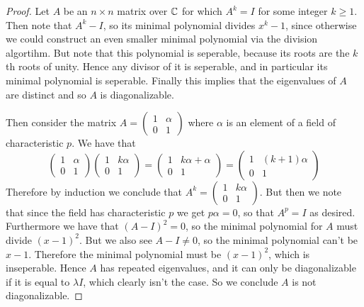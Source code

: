 \documentclass[11pt]{article}
\begin{document}
\begin{proof}
  Let $A$ be an $n \times n$ matrix over $\mathbb{C}$ for which $A^k = I$ for some integer $k \ge 1$. Then note that $A^k - I$, so its minimal polynomial divides $x^k - 1$, since otherwise we could construct an even smaller minimal polynomial via the division algortihm.
  But note that this polynomial is seperable, because its roots are the $k$th roots of unity.
  Hence any divisor of it is seperable, and in particular its minimal polynomial is seperable.
  Finally this implies that the eigenvalues of $A$ are distinct and so $A$ is diagonalizable.

  Then consider the matrix $A = \begin{pmatrix}1 & \alpha \\ 0 & 1\end{pmatrix}$ where $\alpha$ is an element of a field of characteristic $p$.
  We have that
  \begin{equation}
    \begin{pmatrix}
      1 & \alpha \\ 0 & 1
    \end{pmatrix}
    \begin{pmatrix}
      1 & k\alpha \\ 0 & 1
    \end{pmatrix} =
    \begin{pmatrix}
      1 & k\alpha + \alpha \\ 0 & 1
    \end{pmatrix} =
    \begin{pmatrix}
      1 & (k+1)\alpha \\ 0 & 1
    \end{pmatrix}
  \end{equation}
  Therefore by induction we conclude that $A^k = \begin{pmatrix}1 & k\alpha \\ 0 & 1\end{pmatrix}$. But then we note that since the field has characteristic $p$ we get $p\alpha = 0$, so that $A^p = I$ as desired.
  Furthermore we have that $(A-I)^2 = 0$, so the minimal polynomial for $A$ must divide $(x-1)^2$.
  But we also see $A-I \ne 0$, so the minimal polynomial can't be $x-1$.
  Therefore the minimal polynomial must be $(x-1)^2$, which is inseperable.
  Hence $A$ has repeated eigenvalues, and it can only be diagonalizable if it is equal to $\lambda I$, which clearly isn't the case. So we conclude $A$ is not diagonalizable.
\end{proof}
\end{document}
